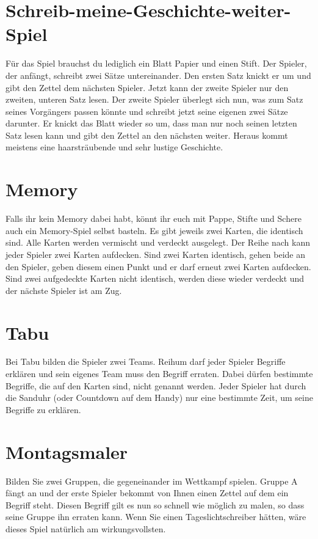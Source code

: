 \documentclass[a4paper]{report}
\begin{document}
\section*{Schreib-meine-Geschichte-weiter-Spiel}
Für das Spiel brauchst du lediglich ein Blatt Papier und einen Stift.
Der Spieler, der anfängt, schreibt zwei Sätze untereinander. Den ersten Satz knickt er um und gibt den Zettel dem nächsten Spieler. Jetzt kann der zweite Spieler nur den zweiten, unteren Satz lesen. Der zweite Spieler überlegt sich nun, was zum Satz seines Vorgängers passen könnte und schreibt jetzt seine eigenen zwei Sätze darunter. Er knickt das Blatt wieder so um, dass man nur noch seinen letzten Satz lesen kann und gibt den Zettel an den nächsten weiter. Heraus kommt meistens eine haarsträubende und sehr lustige Geschichte.

\section*{Memory}
Falls ihr kein Memory dabei habt, könnt ihr euch mit Pappe, Stifte und Schere auch ein Memory-Spiel selbst basteln.
Es gibt jeweils zwei Karten, die identisch sind. Alle Karten werden vermischt und verdeckt ausgelegt. Der Reihe nach kann jeder Spieler zwei Karten aufdecken. Sind zwei Karten identisch, gehen beide an den Spieler, geben diesem einen Punkt und er darf erneut zwei Karten aufdecken. Sind zwei aufgedeckte Karten nicht identisch, werden diese wieder verdeckt und der nächste Spieler ist am Zug.

\section*{Tabu}
Bei Tabu bilden die Spieler zwei Teams. Reihum darf jeder Spieler Begriffe erklären und sein eigenes Team muss den Begriff erraten. Dabei dürfen bestimmte Begriffe, die auf den Karten sind, nicht genannt werden. Jeder Spieler hat durch die Sanduhr (oder Countdown auf dem Handy) nur eine bestimmte Zeit, um seine Begriffe zu erklären.

\section*{Montagsmaler}
Bilden Sie zwei Gruppen, die gegeneinander im Wettkampf spielen. Gruppe A fängt an und der erste Spieler bekommt von Ihnen einen Zettel auf dem ein Begriff steht. Diesen Begriff gilt es nun so schnell wie möglich zu malen, so dass seine Gruppe ihn erraten kann. Wenn Sie einen Tageslichtschreiber hätten, wäre dieses Spiel natürlich am wirkungsvollsten.
\end{document}
